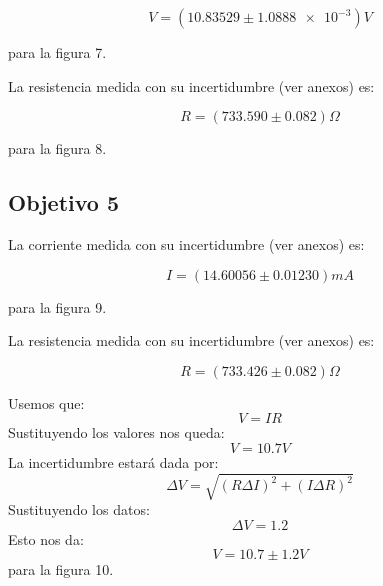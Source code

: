 \documentclass[DIV=calc, paper=a4, fontsize=11pt]{scrartcl}
\begin{document}
\begin{multicols}{2}
\begin{equation*}
    V = (10.83529 \pm \num{1.0888e-3} ) V
\end{equation*}

\noindent para la figura 7.

La resistencia medida con su incertidumbre (ver anexos) es:

\begin{equation*}
    R = (733.590 \pm 0.082) \Omega
\end{equation*}

\noindent para la figura 8.


\subsection*{Objetivo 5}


La corriente medida con su incertidumbre (ver anexos) es:

\begin{equation*}
    I = (14.60056 \pm 0.01230) mA
\end{equation*}

\noindent para la figura 9.

La resistencia medida con su incertidumbre (ver anexos) es:

\begin{equation*}
    R = (733.426 \pm 0.082) \Omega
\end{equation*}

Usemos que:
$$V=IR$$
Sustituyendo los valores nos queda:
$$V=10.7V$$
La incertidumbre estará dada por:
$$\Delta V =\sqrt{(R\Delta I)^2+(I\Delta R)^2}$$
Sustituyendo los datos:
$$\Delta V=1.2$$
Esto nos da:
$$V=10.7\pm 1.2 V$$
\noindent para la figura 10.


\end{multicols}
\end{document}
